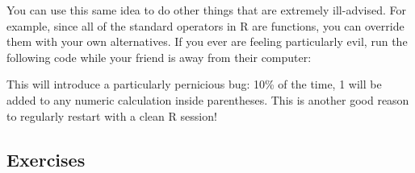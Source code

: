 You can use this same idea to do other things that are extremely
ill-advised. For example, since all of the standard operators in R are
functions, you can override them with your own alternatives. If you ever
are feeling particularly evil, run the following code while your friend
is away from their computer:

\begin{Shaded}
\begin{Highlighting}[]
\DataTypeTok{(} \NormalTok{<-}\StringTok{ }
  \StringTok{ }\NormalTok{(}\NormalTok{) <}\StringTok{ }\NormalTok{) \{}
    \StringTok{ }
  \NormalTok{\}}
\NormalTok{\}}
\NormalTok{(}\NormalTok{, (} \NormalTok{+}\StringTok{ }\NormalTok{))}
\NormalTok{(}\NormalTok{)}
\end{Highlighting}
\end{Shaded}

This will introduce a particularly pernicious bug: 10\% of the time, 1
will be added to any numeric calculation inside parentheses. This is
another good reason to regularly restart with a clean R session!

\subsection{Exercises}

